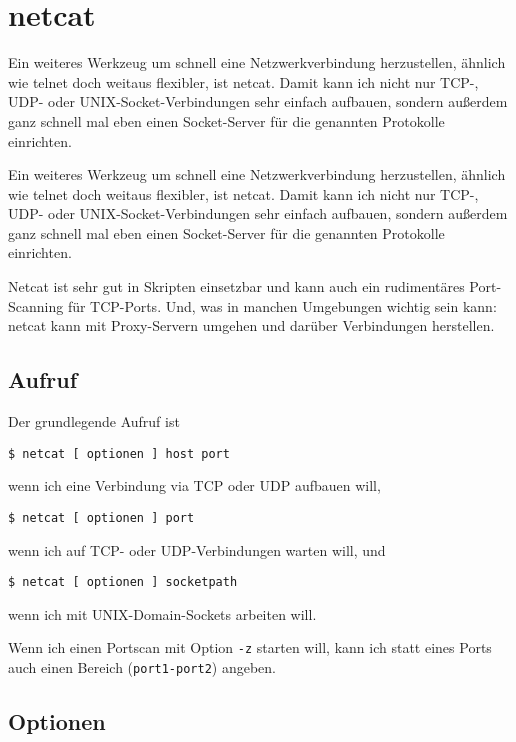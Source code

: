 \section{netcat}
\label{sec:netz-werkzeuge-netcat}
\begin{abstractsec}
  Ein weiteres Werkzeug um schnell eine Netzwerkverbindung herzustellen,
  ähnlich wie telnet doch weitaus flexibler, ist netcat. Damit kann ich nicht
  nur TCP-, UDP- oder UNIX-Socket-Verbindungen sehr einfach aufbauen, sondern
  außerdem ganz schnell mal eben einen Socket-Server für die genannten
  Protokolle einrichten.
\end{abstractsec}
\begin{normaltext}
  Ein weiteres Werkzeug um schnell eine Netzwerkverbindung herzustellen,
  ähnlich wie telnet doch weitaus flexibler, ist netcat. Damit kann ich nicht
  nur TCP-, UDP- oder UNIX-Socket-Verbindungen sehr einfach aufbauen, sondern
  außerdem ganz schnell mal eben einen Socket-Server für die genannten
  Protokolle einrichten.

  Netcat ist sehr gut in Skripten einsetzbar und kann auch ein rudimentäres
  Port-Scanning für TCP-Ports. Und, was in manchen Umgebungen wichtig sein
  kann: netcat kann mit Proxy-Servern umgehen und darüber Verbindungen
  herstellen.

  \subsection*{Aufruf}

  Der grundlegende Aufruf ist
  \begin{verbatim}
$ netcat [ optionen ] host port
  \end{verbatim}
  wenn ich eine Verbindung via TCP oder UDP aufbauen will,
  \begin{verbatim}
$ netcat [ optionen ] port
  \end{verbatim}
  wenn ich auf TCP- oder UDP-Verbindungen warten will, und
  \begin{verbatim}
$ netcat [ optionen ] socketpath
  \end{verbatim}
  wenn ich mit UNIX-Domain-Sockets arbeiten will.

  Wenn ich einen Portscan mit Option \verb?-z? starten will, kann ich statt
  eines Ports auch einen Bereich (\verb?port1-port2?) angeben.

  \subsection*{Optionen}


\end{normaltext}
